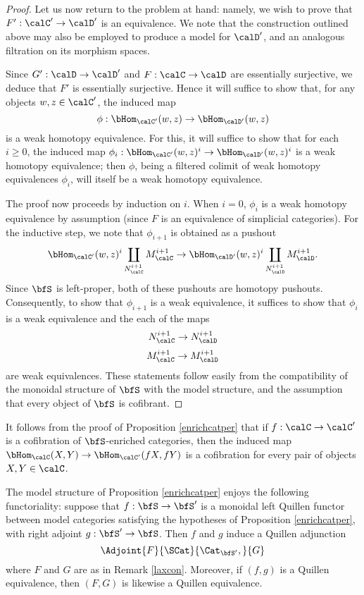 \begin{proof}
Let us now return to the problem at hand: namely, we wish to prove that $F': \calC' \rightarrow \calD'$ is an equivalence. We note that the construction outlined above may also be employed to produce a model for $\calD'$, and an analogous filtration on its morphism spaces.

Since $G': \calD \rightarrow \calD'$ and $F: \calC \rightarrow \calD$ are essentially surjective, we deduce that $F'$ is essentially surjective. Hence it will suffice to show that, for any objects $w,z \in \calC'$, the induced map $$\phi: \bHom_{\calC'}(w,z) \rightarrow \bHom_{\calD'}(w,z)$$ is a weak homotopy equivalence.
For this, it will suffice to show that for each $i \geq 0$, the induced map $\phi_i: \bHom_{\calC'}(w,z)^i \rightarrow \bHom_{\calD'}(w,z)^i$ is a weak homotopy equivalence; then $\phi$, being a filtered colimit of weak homotopy equivalences $\phi_i$, will itself be a weak homotopy equivalence.

The proof now proceeds by induction on $i$. When $i=0$, $\phi_i$ is a weak homotopy equivalence by assumption (since $F$ is an equivalence of simplicial categories). For the inductive step, we note that
$\phi_{i+1}$ is obtained as a pushout
$$ \bHom_{\calC'}(w,z)^i \coprod_{ N^{i+1}_{\calC}} M^{i+1}_{\calC} \rightarrow \bHom_{\calD'}(w,z)^i \coprod_{ N^{i+1}_{\calD} } M^{i+1}_{\calD}.$$
Since $\bfS$ is left-proper, both of these pushouts are homotopy pushouts. Consequently, to show that $\phi_{i+1}$ is a weak equivalence, it suffices to show that $\phi_i$ is a weak equivalence and the each of the maps
$$ N^{i+1}_{\calC} \rightarrow N^{i+1}_{\calD}$$
$$ M^{i+1}_{\calC} \rightarrow M^{i+1}_{\calD}$$
are weak equivalences. These statements follow easily from the compatibility of the monoidal
structure of $\bfS$ with the model structure, and the assumption that every object of $\bfS$ is cofibrant.
\end{proof}

\begin{remark}
It follows from the proof of Proposition \ref{enrichcatper} that if
$f: \calC \rightarrow \calC'$ is a cofibration of $\bfS$-enriched categories, then
the induced map $\bHom_{\calC}(X,Y) \rightarrow \bHom_{\calC'}(fX,fY)$ is a cofibration
for every pair of objects $X,Y \in \calC$.
\end{remark}

\begin{remark}\label{cuttup}
The model structure of Proposition \ref{enrichcatper} enjoys the following functoriality:
suppose that $f: \bfS \rightarrow \bfS'$ is a monoidal left Quillen functor between
model categories satisfying the hypotheses of Proposition \ref{enrichcatper}, with right adjoint $g: \bfS' \rightarrow \bfS$. Then $f$ and $g$ induce a Quillen adjunction
$$ \Adjoint{ F}{\SCat}{\Cat_{\bfS'},}{G}$$
where $F$ and $G$ are as in Remark \ref{laxcon}. Moreover, if $(f,g)$ is a Quillen equivalence,
then $(F,G)$ is likewise a Quillen equivalence.
\end{remark}

